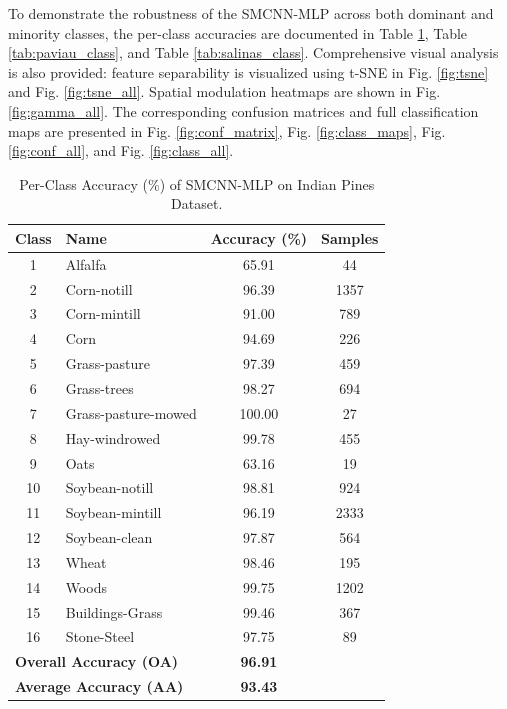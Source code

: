 \documentclass[pdflatex,sn-mathphys-num,iicol]{sn-jnl}
\begin{document}
To demonstrate the robustness of the SMCNN-MLP across both dominant and minority classes, the per-class accuracies are documented in Table \ref{tab:indian_pines_class}, Table \ref{tab:paviau_class}, and Table \ref{tab:salinas_class}. Comprehensive visual analysis is also provided: feature separability is visualized using t-SNE in Fig. \ref{fig:tsne} and Fig. \ref{fig:tsne_all}. Spatial modulation heatmaps are shown in Fig. \ref{fig:gamma_all}. The corresponding confusion matrices and full classification maps are presented in Fig. \ref{fig:conf_matrix}, Fig. \ref{fig:class_maps}, Fig. \ref{fig:conf_all}, and Fig. \ref{fig:class_all}. 

\begin{table}[htbp]
\centering
\caption{Per-Class Accuracy (\%) of SMCNN-MLP on Indian Pines Dataset.}
\label{tab:indian_pines_class}
\begin{tabular}{clcc}
\toprule
\textbf{Class} & \textbf{Name} & \textbf{Accuracy (\%)} & \textbf{Samples} \\
\midrule
1 & Alfalfa & 65.91 & 44 \\
2 & Corn-notill & 96.39 & 1357 \\
3 & Corn-mintill & 91.00 & 789 \\
4 & Corn & 94.69 & 226 \\
5 & Grass-pasture & 97.39 & 459 \\
6 & Grass-trees & 98.27 & 694 \\
7 & Grass-pasture-mowed & 100.00 & 27 \\
8 & Hay-windrowed & 99.78 & 455 \\
9 & Oats & 63.16 & 19 \\
10 & Soybean-notill & 98.81 & 924 \\
11 & Soybean-mintill & 96.19 & 2333 \\
12 & Soybean-clean & 97.87 & 564 \\
13 & Wheat & 98.46 & 195 \\
14 & Woods & 99.75 & 1202 \\
15 & Buildings-Grass & 99.46 & 367 \\
16 & Stone-Steel & 97.75 & 89 \\
\midrule
\multicolumn{2}{l}{\textbf{Overall Accuracy (OA)}} & \textbf{96.91} & \\
\multicolumn{2}{l}{\textbf{Average Accuracy (AA)}} & \textbf{93.43} & \\
\bottomrule
\end{tabular}
\end{table}
\end{document}
